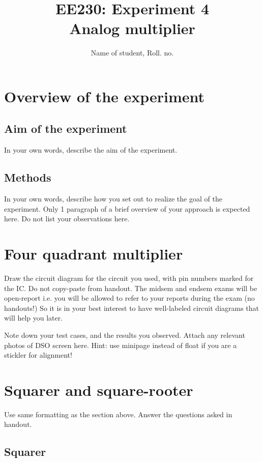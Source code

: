 \documentclass[12pt]{article}
\title{EE230: Experiment 4\\
Analog multiplier}
\author{Name of student, Roll. no.}
\begin{document}
\maketitle

\section{Overview of the experiment}

\subsection{Aim of the experiment}

In your own words, describe the aim of the experiment.

\subsection{Methods}

In your own words, describe how you set out to realize the goal of the experiment. Only 1 paragraph of a brief overview of your approach is expected here. Do not list your observations here.

\section{Four quadrant multiplier}

Draw the circuit diagram for the circuit you used, with pin numbers marked for the IC. Do not copy-paste from handout. The midsem and endsem exams will be open-report i.e. you will be allowed to refer to your reports during the exam (no handouts!) So it is in your best interest to have well-labeled circuit diagrams that will help you later.

Note down your test cases, and the results you observed. Attach any relevant photos of DSO screen here. Hint: use minipage instead of float if you are a stickler for alignment!

\section{Squarer and square-rooter}

Use same formatting as the section above. Answer the questions asked in handout.

\subsection{Squarer}
\end{document}
